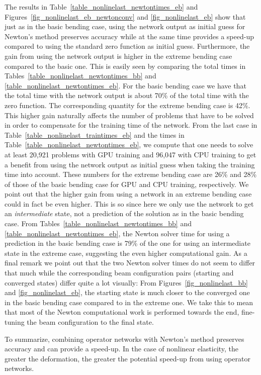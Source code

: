 \documentclass[12pt]{article}
\begin{document}
The results in Table~\ref{table_nonlinelast_newtontimes_eb} and Figures~\ref{fig_nonlinelast_eb_newtonconv} and \ref{fig_nonlinelast_eb} show that just as in the basic bending case, using the network output as initial guess for Newton's method preserves accuracy while at the same time provides a speed-up compared to using the standard zero function as initial guess. Furthermore, the gain from using the network output is higher in the extreme bending case compared to the basic one. This is easily seen by comparing the total times in Tables~\ref{table_nonlinelast_newtontimes_bb} and \ref{table_nonlinelast_newtontimes_eb}. For the basic bending case we have that the total time with the network output is about 70\% of the total time with the zero function. The corresponding quantity for the extreme bending case is 42\%. This higher gain naturally affects the number of problems that have to be solved in order to compensate for the training time of the network. From the last case in Table~\ref{table_nonlinelast_traintimes_eb} and the times in Table~\ref{table_nonlinelast_newtontimes_eb}, we compute that one needs to solve at least 20,921 problems with GPU training and 96,047 with CPU training to get a benefit from using the network output as initial guess when taking the training time into account. These numbers for the extreme bending case are 26\% and 28\% of those of the basic bending case for GPU and CPU training, respectively. We point out that the higher gain from using a network in an extreme bending case could in fact be even higher. This is so since here we only use the network to get an \emph{intermediate} state, not a prediction of the solution as in the basic bending case. From Tables~\ref{table_nonlinelast_newtontimes_bb} and \ref{table_nonlinelast_newtontimes_eb}, the Newton solver time for using a prediction in the basic bending case is 79\% of the one for using an intermediate state in the extreme case, suggesting the even higher computational gain. As a final remark we point out that the two Newton solver times do not seem to differ that much while the corresponding beam configuration pairs (starting and converged states) differ quite a lot visually: From Figures~\ref{fig_nonlinelast_bb} and \ref{fig_nonlinelast_eb}, the starting state is much closer to the converged one in the basic bending case compared to in the extreme one. We take this to mean that most of the Newton computational work is performed towards the end, fine-tuning the beam configuration to the final state.

To summarize, combining operator networks with Newton's method preserves accuracy and can provide a speed-up. In the case of nonlinear elasticity, the greater the deformation, the greater the potential speed-up from using operator networks.
\end{document}
